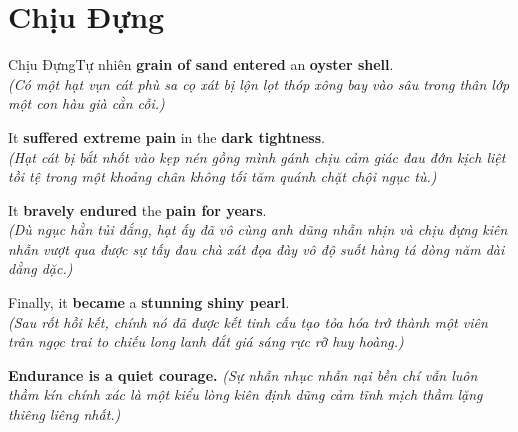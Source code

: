 \section{Chịu Đựng}
\begin{truyen}{Chịu Đựng}{Tự nhiên}
 \textbf{grain of sand entered} an \textbf{oyster shell}.\\
\textit{(Có một hạt vụn cát phù sa cọ xát bị lộn lọt thóp xông bay vào sâu trong thân lớp một con hàu già cằn cỗi.)}

It \textbf{suffered extreme pain} in the \textbf{dark tightness}.\\
\textit{(Hạt cát bị bắt nhốt vào kẹp nén gồng mình gánh chịu cảm giác đau đớn kịch liệt tồi tệ trong một khoảng chân không tối tăm quánh chặt chội ngục tù.)}

It \textbf{bravely endured} the \textbf{pain for years}.\\
\textit{(Dù ngục hằn tủi đắng, hạt ấy đã vô cùng anh dũng nhẫn nhịn và chịu đựng kiên nhẫn vượt qua được sự tấy đau chà xát đọa đày vô độ suốt hàng tá dòng năm dài dằng dặc.)}

Finally, it \textbf{became} a \textbf{stunning shiny pearl}.\\
\textit{(Sau rốt hồi kết, chính nó đã được kết tinh cấu tạo tỏa hóa trở thành một viên trân ngọc trai to chiếu long lanh đắt giá sáng rực rỡ huy hoàng.)}
\end{truyen}

\begin{baihoc}
  \textbf{Endurance is a quiet courage.} \textit{(Sự nhẫn nhục nhẫn nại bền chí vẫn luôn thầm kín chính xác là một kiểu lòng kiên định dũng cảm tĩnh mịch thầm lặng thiêng liêng nhất.)}
\end{baihoc}

\vspace{0.8cm}

\ngayDay{}
